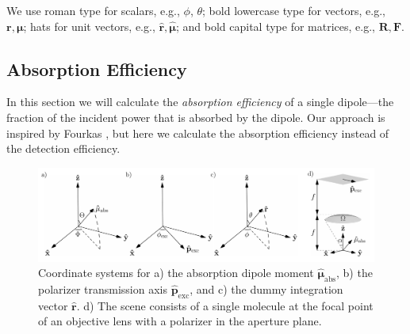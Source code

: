 \documentclass[10pt]{article}
\providecommand{\mb}[1]{\mathbf{#1}}
\providecommand{\mh}[1]{\mathbf{\hat{#1}}}
\providecommand{\bs}[1]{\boldsymbol{#1}}
\begin{document}
We use roman type for scalars, e.g., $\phi$, $\theta$; bold lowercase type for
vectors, e.g., $\mb{r}, \bs{\mu}$; hats for unit vectors, e.g.,
$\mh{r}, \hat{\bs{\mu}}$; and bold capital type for matrices, e.g.,
$\mb{R}, \mb{F}$.

\subsection{Absorption Efficiency}\label{excitation}
In this section we will calculate the \emph{absorption efficiency} of a single
dipole---the fraction of the incident power that is absorbed by the
dipole. Our approach is inspired by Fourkas \cite{fourkas2001}, but here we
calculate the absorption efficiency instead of the detection efficiency.

\begin{figure}[H]
\centering\includegraphics[width=\textwidth]{frames}
\caption{Coordinate systems for a) the absorption dipole moment
  $\hat{\bs{\mu}}_{\text{abs}}$, b) the polarizer transmission axis
   $\hat{\mb{p}}_{\text{exc}}$, and c) the dummy integration vector
  $\hat{\mb{r}}$. d) The scene consists of a single molecule at the focal point
  of an objective lens with a polarizer in the aperture plane.}
\hypertarget{typo}{}
\label{fig:coordinates}
\end{figure}
\end{document}
